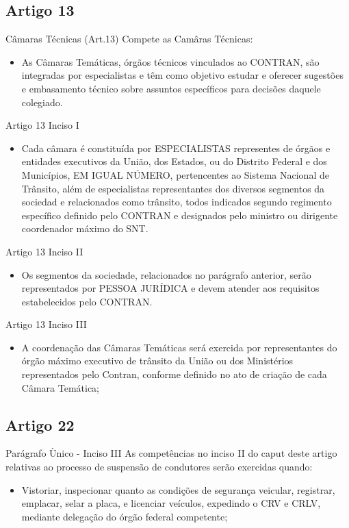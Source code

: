\documentclass{beamer}
\begin{document}
\subsection{Artigo 13}
\begin{frame}{Câmaras Técnicas (Art.13)}
Compete as Camâras Técnicas:
    \begin{itemize}
        \item \justifying As Câmaras Temáticas, órgãos técnicos vinculados ao CONTRAN, são integradas por especialistas e têm como objetivo estudar e oferecer sugestões e embasamento técnico sobre assuntos específicos para decisões daquele colegiado.
    \end{itemize}
\end{frame}
\begin{frame}{Artigo 13 Inciso I}
    \begin{itemize}
        \item \justifying Cada câmara é constituída por ESPECIALISTAS representes de órgãos e entidades executivos da União, dos Estados, ou do Distrito Federal e dos Municípios, EM IGUAL NÚMERO, pertencentes ao Sistema Nacional de Trânsito, além de especialistas representantes dos diversos segmentos da sociedad e relacionados como trânsito, todos indicados segundo regimento específico definido pelo CONTRAN e designados pelo ministro ou dirigente coordenador máximo do SNT.
    \end{itemize}
\end{frame}
\begin{frame}{Artigo 13 Inciso II}
    \begin{itemize}
        \item \justifying Os segmentos da sociedade, relacionados no parágrafo anterior, serão representados por PESSOA JURÍDICA e devem atender aos requisitos estabelecidos pelo CONTRAN.
    \end{itemize}
\end{frame}
\begin{frame}{Artigo 13 Inciso III}
    \begin{itemize}
        \item \justifying A coordenação das Câmaras Temáticas será exercida por representantes do órgão máximo executivo de trânsito da União ou dos Ministérios representados pelo Contran, conforme definido no ato de criação de cada Câmara Temática;
    \end{itemize}
\end{frame}
\subsection{Artigo 22}
\begin{frame}{Parágrafo Ùnico - Inciso III}
\justifying 
As competências no inciso II do caput deste artigo relativas ao processo de suspensão de condutores serão exercidas quando:
    \begin{itemize}
        \item \justifying Vistoriar, inspecionar quanto as condições de segurança veicular, registrar, emplacar, selar a placa, e licenciar veículos, expedindo o CRV e CRLV, mediante delegação do órgão federal competente;
    \end{itemize}
\end{frame}
\end{document}

